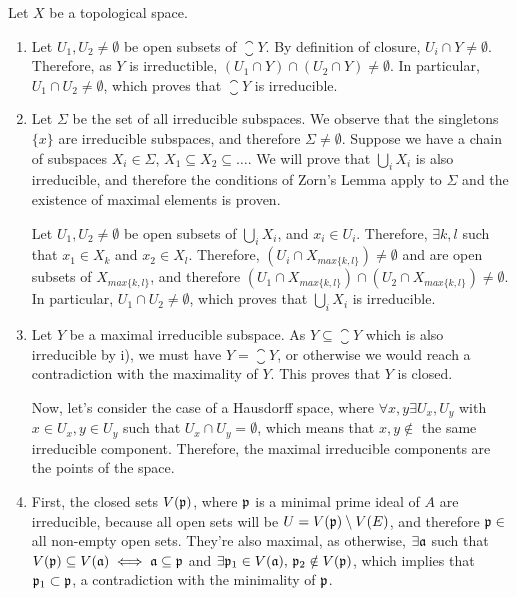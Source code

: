 \begin{sol}
	Let $X$ be a topological space.
	\begin{enumerate}[label=(\roman*)]
		\item Let $U_1, U_2 \neq \emptyset$ be open subsets of $\closure{Y}$. By definition of closure, $U_i \cap Y \neq \emptyset$. Therefore, as $Y$ is irreductible, $(U_1 \cap Y) \cap (U_2 \cap Y) \neq \emptyset$. In particular, $U_1 \cap U_2 \neq \emptyset$, which proves that $\closure{Y}$ is irreducible.

		\item Let $\Sigma$ be the set of all irreducible subspaces. We observe that the singletons $\{x\}$ are irreducible subspaces, and therefore $\Sigma \neq \emptyset$. Suppose we have a chain of subspaces $X_i \in \Sigma$, $X_1 \subseteq X_2 \subseteq \dots$. We will prove that $\bigcup_{i} X_i$ is also irreducible, and therefore the conditions of Zorn's Lemma apply to $\Sigma$ and the existence of maximal elements is proven.

		Let $U_1, U_2 \neq \emptyset$ be open subsets of $\bigcup_{i} X_i$, and $x_i \in U_i$. Therefore, $\exists k,l$ such that $x_1 \in X_{k}$ and $x_2 \in X_{l}$. Therefore, $(U_i \cap X_{max\{k,l\}}) \neq \emptyset$ and are open subsets of $X_{max\{k,l\}}$, and therefore $(U_1 \cap X_{max\{k,l\}}) \cap (U_2 \cap X_{max\{k,l\}}) \neq \emptyset$. In particular, $U_1 \cap U_2 \neq \emptyset$, which proves that $\bigcup_{i} X_i$ is irreducible.

		\item Let $Y$ be a maximal irreducible subspace. As $Y \subseteq \closure{Y}$ which is also irreducible by i), we must have $Y = \closure{Y}$, or otherwise we would reach a contradiction with the maximality of $Y$. This proves that $Y$ is closed.

		Now, let's consider the case of a Hausdorff space, where $\forall x,y \exists U_x, U_y$ with $x \in U_x, y \in U_y$ such that $U_x \cap U_y = \emptyset$, which means that $x,y \notin$ the same irreducible component. Therefore, the maximal irreducible components are the points of the space.

		\item First, the closed sets $V(\mathfrak{p})$, where $\mathfrak{p}$ is a minimal prime ideal of $A$ are irreducible, because all open sets will be $U = V(\mathfrak{p}) \setminus V(E)$, and therefore $\mathfrak{p} \in$ all non-empty open sets. They're also maximal, as otherwise, $ \exists \mathfrak{a}$ such that $V(\mathfrak{p}) \subseteq V(\mathfrak{a}) \iff \mathfrak{a} \subseteq \mathfrak{p}$ and $\exists \mathfrak{p}_1 \in V(\mathfrak{a}), \, \mathfrak{p}_2 \notin V(\mathfrak{p})$, which implies that $\mathfrak{p}_1 \subset \mathfrak{p}$, a contradiction with the minimality of $\mathfrak{p}$.


\end{enumerate}
\end{sol}
